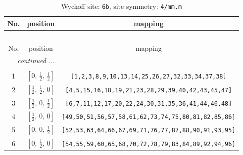\documentclass[fleqn,8pt]{jsarticle}
\begin{document}
\begin{longtable}{ccc}
\caption{Wyckoff site: {\tt 6b}, site symmetry: {\tt 4/mm.m}}
 \\
 \hline \hline
No. & position & mapping \\ \hline \endfirsthead

\multicolumn{2}{l}{\tablename\ \thetable{}} \\
 \hline \hline
No. & position & mapping \\ \hline \endhead

 \hline \hline
\multicolumn{2}{r}{\footnotesize\it continued ...} \\ \endfoot

 \hline \hline
\multicolumn{2}{r}{} \\ \endlastfoot

1 & $\left[ 0,\, \frac{1}{2},\, \frac{1}{2} \right]$ & {\tt [1,2,3,8,9,10,13,14,25,26,27,32,33,34,37,38]} \\ \hline
2 & $\left[ \frac{1}{2},\, \frac{1}{2},\, 0 \right]$ & {\tt [4,5,15,16,18,19,21,23,28,29,39,40,42,43,45,47]} \\ \hline
3 & $\left[ \frac{1}{2},\, 0,\, \frac{1}{2} \right]$ & {\tt [6,7,11,12,17,20,22,24,30,31,35,36,41,44,46,48]} \\ \hline
4 & $\left[ \frac{1}{2},\, 0,\, 0 \right]$ & {\tt [49,50,51,56,57,58,61,62,73,74,75,80,81,82,85,86]} \\ \hline
5 & $\left[ 0,\, 0,\, \frac{1}{2} \right]$ & {\tt [52,53,63,64,66,67,69,71,76,77,87,88,90,91,93,95]} \\ \hline
6 & $\left[ 0,\, \frac{1}{2},\, 0 \right]$ & {\tt [54,55,59,60,65,68,70,72,78,79,83,84,89,92,94,96]} \\
\end{longtable}
\renewcommand{\arraystretch}{1.2}
\end{document}
